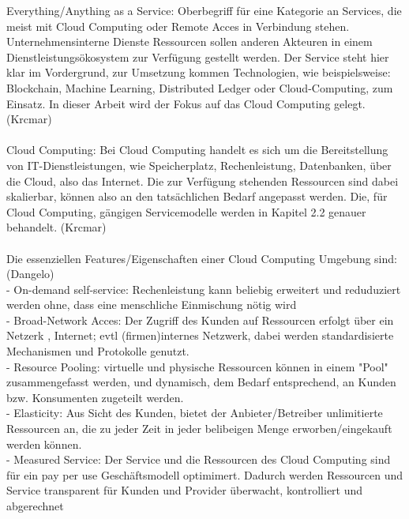 \documentclass[12pt,toc=bib,toc=listof]{scrreprt}
\begin{document}
Everything/Anything as a Service: Oberbegriff für eine Kategorie an Services, die meist mit
 Cloud Computing oder Remote Acces in Verbindung stehen. Unternehmensinterne Dienste Ressourcen sollen anderen Akteuren in einem
 Dienstleistungsökosystem zur Verfügung gestellt werden. 
 Der Service steht hier klar im Vordergrund, zur Umsetzung kommen Technologien, wie beispielsweise: Blockchain, Machine Learning, 
 Distributed Ledger oder Cloud-Computing, zum Einsatz. In dieser Arbeit wird der Fokus auf das Cloud Computing gelegt. (Krcmar)
 \\ \\
 Cloud Computing: Bei Cloud Computing handelt es sich um die Bereitstellung von IT-Dienstleistungen, wie 
Speicherplatz, Rechenleistung, Datenbanken, über die Cloud, also das Internet. 
Die zur Verfügung stehenden Ressourcen sind dabei skalierbar, können also an den tatsächlichen Bedarf angepasst werden. Die, für Cloud Computing, gängigen Servicemodelle werden
in Kapitel 2.2 genauer behandelt. (Krcmar)
\\ \\
Die essenziellen Features/Eigenschaften einer Cloud Computing Umgebung sind: (Dangelo) \\
- On-demand self-service: Rechenleistung kann beliebig erweitert und reduduziert werden ohne, 
dass eine menschliche Einmischung nötig wird \\
- Broad-Network Acces: Der Zugriff des Kunden auf Ressourcen erfolgt über ein Netzerk
, Internet; evtl (firmen)internes Netzwerk, dabei werden standardisierte Mechanismen 
und Protokolle genutzt. \\
- Resource Pooling: virtuelle und physische Ressourcen können in einem "Pool" zusammengefasst werden,
 und dynamisch, dem Bedarf entsprechend, an Kunden bzw. Konsumenten zugeteilt werden. \\
- Elasticity: Aus Sicht des Kunden, bietet der Anbieter/Betreiber unlimitierte Ressourcen an,
 die zu jeder Zeit in jeder belibeigen Menge erworben/eingekauft werden können. \\
- Measured Service: Der Service und die Ressourcen des Cloud Computing sind für ein pay per use Geschäftsmodell optimimert. Dadurch werden Ressourcen und Service transparent für Kunden und Provider überwacht, kontrolliert und abgerechnet 
\end{document}
